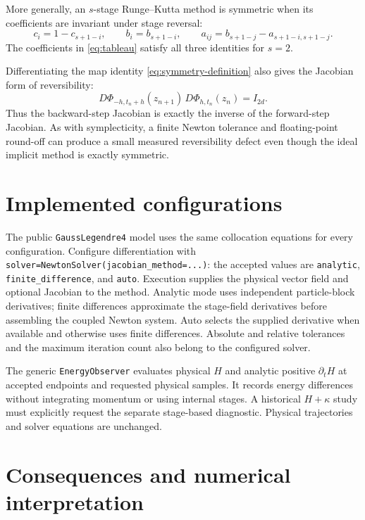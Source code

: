 \documentclass[11pt,a4paper]{article}
\newcommand{\Id}{I}
\begin{document}
More generally, an $s$-stage Runge--Kutta method is symmetric when its
coefficients are invariant under stage reversal:
\begin{equation}
 \boxed{
 c_i=1-c_{s+1-i},
 \qquad
 b_i=b_{s+1-i},
 \qquad
 a_{ij}=b_{s+1-j}-a_{s+1-i,s+1-j}.
 }
 \label{eq:rk-symmetry-condition}
\end{equation}
The coefficients in \eqref{eq:tableau} satisfy all three identities for
$s=2$.

Differentiating the map identity \eqref{eq:symmetry-definition} also gives the
Jacobian form of reversibility:
\begin{equation}
 \boxed{
 D\Phi_{-h,t_n+h}(z_{n+1})\,
 D\Phi_{h,t_n}(z_n)=\Id_{2d}.
 }
 \label{eq:jacobian-reversibility}
\end{equation}
Thus the backward-step Jacobian is exactly the inverse of the forward-step
Jacobian.  As with symplecticity, a finite Newton tolerance and floating-point
round-off can produce a small measured reversibility defect even though the
ideal implicit method is exactly symmetric.

\clearpage

\section{Implemented configurations}

The public \texttt{GaussLegendre4} model uses the same collocation equations
for every configuration. Configure differentiation with
\texttt{solver=NewtonSolver(jacobian\_method=...)}: the accepted values are
\texttt{analytic}, \texttt{finite\_difference}, and \texttt{auto}.
Execution supplies the physical vector field and optional Jacobian to the method.
Analytic mode uses independent particle-block derivatives; finite differences
approximate the stage-field derivatives before assembling the coupled Newton
system. Auto selects the supplied derivative when available and otherwise uses
finite differences. Absolute and relative tolerances and the maximum iteration
count also belong to the configured solver.

The generic \texttt{EnergyObserver} evaluates physical $H$ and analytic
positive $\partial_t H$ at accepted endpoints and requested physical samples.
It records energy differences without integrating momentum or using internal
stages. A historical $H+\kappa$ study must explicitly request the separate
stage-based diagnostic. Physical trajectories and solver equations are unchanged.


\section{Consequences and numerical interpretation}
\end{document}
